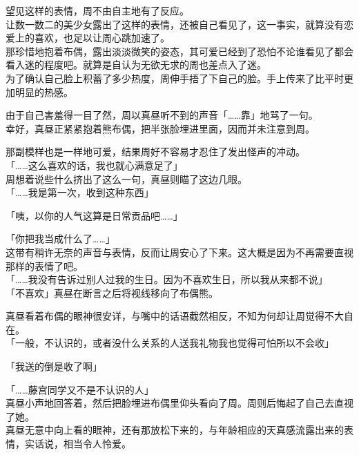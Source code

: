 望见这样的表情，周不由自主地有了反应。\\

让数一数二的美少女露出了这样的表情，还被自己看见了，这一事实，就算没有恋爱上的喜欢，也足以让周心跳加速了。\\

那珍惜地抱着布偶，露出淡淡微笑的姿态，其可爱已经到了恐怕不论谁看见了都会看入迷的程度吧。就算是自认为无欲无求的周也差点入了迷。\\

为了确认自己脸上积蓄了多少热度，周伸手捂了下自己的脸。手上传来了比平时更加明显的热感。

由于自己害羞得一目了然，周以真昼听不到的声音「……靠」地骂了一句。\\

幸好，真昼正紧紧抱着熊布偶，把半张脸埋进里面，因而并未注意到周。

那副模样也是一样地可爱，结果周好不容易才忍住了发出怪声的冲动。\\

「……这么喜欢的话，我也就心满意足了」\\

周想着说些什么挤出了这么一句，真昼则瞄了这边几眼。\\

「……我是第一次，收到这种东西」

「咦，以你的人气这算是日常贡品吧……」

「你把我当成什么了……」\\

这带有稍许无奈的声音与表情，反而让周安心了下来。这大概是因为不再需要直视那样的表情了吧。\\

「……我没有告诉过别人过我的生日。因为不喜欢生日，所以我从来都不说」\\

「不喜欢」真昼在断言之后将视线移向了布偶熊。

真昼看着布偶的眼神很安详，与嘴中的话语截然相反，不知为何却让周觉得不大自在。\\

「一般，不认识的，或者没什么关系的人送我礼物我也觉得可怕所以不会收」

「我送的倒是收了啊」

「……藤宫同学又不是不认识的人」\\

真昼小声地回答着，然后把脸埋进布偶里仰头看向了周。周则后悔起了自己去直视了她。\\

真昼无意中向上看的眼神，还有那放松下来的，与年龄相应的天真感流露出来的表情，实话说，相当令人怜爱。

